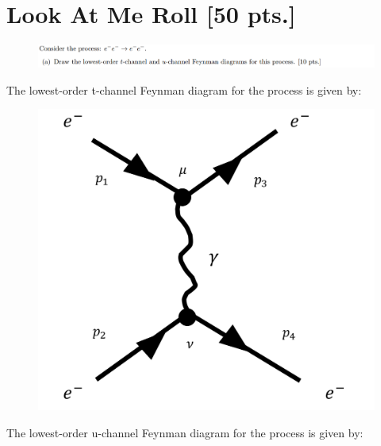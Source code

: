 \documentclass[11pt]{article}
\theoremstyle{definition}
\numberwithin{equation}{section}
\begin{document}
\newpage


\section{\textbf{Look At Me Roll} [50 pts.]}


\begin{figure}[H]
    \centering
    \includegraphics[scale = 0.4]{2a.png}
\end{figure}

The lowest-order t-channel Feynman diagram for the process is given by:

\begin{figure}[H]
    \centering
    \includegraphics[scale = 0.4]{moller t-channel.png}
\end{figure}


The lowest-order u-channel Feynman diagram for the process is given by:
\end{document}
